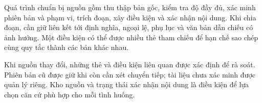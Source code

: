 Quá trình chuẩn bị nguồn gồm thu thập bản gốc, kiểm tra độ đầy đủ, xác minh
phiên bản và phạm vi, trích đoạn, xây điều kiện và xác nhận nội dung. Khi
chia đoạn, cần giữ liên kết tới định nghĩa, ngoại lệ, phụ lục và văn bản dẫn
chiếu có ảnh hưởng. Một điều kiện có thể được nhiều thẻ tham chiếu để hạn
chế sao chép cùng quy tắc thành các bản khác nhau.

Khi nguồn thay đổi, những thẻ và điều kiện liên quan được xác định để rà
soát. Phiên bản cũ được giữ khi còn cần xét chuyển tiếp; tài liệu chưa xác
minh được quản lý riêng. Kho nguồn và trạng thái xác nhận nội dung là điều
kiện để lựa chọn căn cứ phù hợp cho mỗi tình huống.
